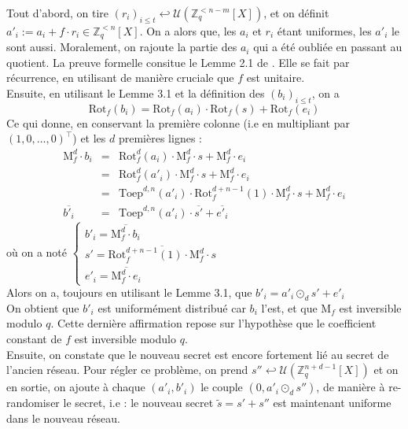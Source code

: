 \documentclass[11pt,a4paper]{article}
\begin{document}
Tout d'abord, on tire $(r_i)_{i\leq t} \hookleftarrow \mathcal{U}(\mathbb{Z}_q^{<n-m}[X])$, et on définit $a'_i := a_i + f\cdot r_i \in \mathbb{Z}_q^{<n}[X]$. On a alors que, les $a_i$ et $r_i$ étant uniformes, les $a'_i$ le sont aussi. Moralement, on rajoute la partie des $a_i$ qui a été oubliée en passant au quotient. La preuve formelle consitue le Lemme 2.1 de \cite{psis}. Elle se fait par récurrence, en utilisant de manière cruciale que $f$ est unitaire. \\

Ensuite, en utilisant le Lemme 3.1 et la définition des $(b_i)_{i\leq t}$, on a 
\[\text{Rot}_f(b_i)=\text{Rot}_f(a_i)\cdot\text{Rot}_f(s)+\text{Rot}_f(e_i)\]
Ce qui donne, en conservant la première colonne (i.e en multipliant par $(1,0,\dots,0)^\top$) et les $d$ premières lignes :
\begin{eqnarray*}
\text{M}_f^d\cdot b_i &=& \text{Rot}_f^d(a_i)\cdot\text{M}_f^d\cdot s +\text{M}_f^d\cdot e_i \\
&=& \text{Rot}_f^d(a'_i)\cdot\text{M}_f^d\cdot s +\text{M}_f^d\cdot e_i  \\
&=& \text{Toep}^{d,n}(a'_i)\cdot\text{Rot}^{d+n-1}_f(1)\cdot\text{M}_f^d\cdot s +\text{M}_f^d\cdot e_i  \\
\overline{b'_i}&=& \text{Toep}^{d,n}(a'_i)\cdot\overline{s'} + \overline{e'_i}
\end{eqnarray*}
où on a noté $\begin{cases} b'_i = \overline{\text{M}_f^d\cdot b_i} \\ s' = \overline{\text{Rot}^{d+n-1}_f(1)\cdot\text{M}_f^d\cdot s} \\ e'_i = \overline{\text{M}_f^d\cdot e_i} \end{cases}$ \\

Alors on a, toujours en utilisant le Lemme 3.1, que $b'_i = a'_i \odot_d s' + e'_i$ \\

On obtient que $b'_i$ est uniformément distribué car $b_i$ l'est, et que $\text{M}_f$ est inversible modulo $q$. Cette dernière affirmation repose sur l'hypothèse que le coefficient constant de $f$ est inversible modulo $q$. \\

Ensuite, on constate que le nouveau secret est encore fortement lié au secret de l'ancien réseau. Pour régler ce problème, on prend $s'' \hookleftarrow \mathcal{U}(\mathbb{Z}_q^{n+d-1}[X])$ et on en sortie, on ajoute à chaque $(a'_i,b'_i)$ le couple $(0,a'_i\odot_d s'')$, de manière à re-randomiser le secret, i.e : le nouveau secret $\tilde s = s'+s''$ est maintenant uniforme dans le nouveau réseau.  \\
\end{document}

